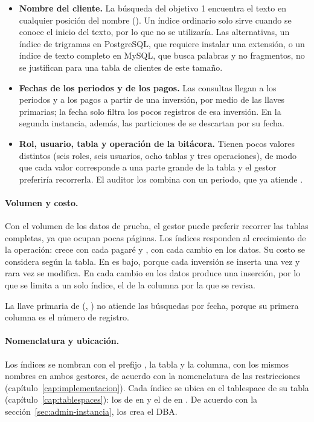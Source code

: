 \begin{itemize}[leftmargin=*]
	\item \textbf{Nombre del cliente.} La búsqueda del objetivo 1 encuentra el texto en cualquier posición del nombre (). Un índice ordinario solo sirve cuando se conoce el inicio del texto, por lo que no se utilizaría. Las alternativas, un índice de trigramas en PostgreSQL, que requiere instalar una extensión, o un índice de texto completo en MySQL, que busca palabras y no fragmentos, no se justifican para una tabla de clientes de este tamaño.
	\item \textbf{Fechas de los periodos y de los pagos.} Las consultas llegan a los periodos y a los pagos a partir de una inversión, por medio de las llaves primarias; la fecha solo filtra los pocos registros de esa inversión. En la segunda instancia, además, las particiones de  se descartan por su fecha.
	\item \textbf{Rol, usuario, tabla y operación de la bitácora.} Tienen pocos valores distintos (seis roles, seis usuarios, ocho tablas y tres operaciones), de modo que cada valor corresponde a una parte grande de la tabla y el gestor preferiría recorrerla. El auditor los combina con un periodo, que ya atiende .
\end{itemize}

\paragraph{Volumen y costo.} Con el volumen de los datos de prueba, el gestor puede preferir recorrer las tablas completas, ya que ocupan pocas páginas. Los índices responden al crecimiento de la operación:  crece con cada pagaré y , con cada cambio en los datos. Su costo se considera según la tabla. En  es bajo, porque cada inversión se inserta una vez y rara vez se modifica. En  cada cambio en los datos produce una inserción, por lo que se limita a un solo índice, el de la columna por la que se revisa.

La llave primaria de  (, ) no atiende las búsquedas por fecha, porque su primera columna es el número de registro.

\paragraph{Nomenclatura y ubicación.} Los índices se nombran con el prefijo , la tabla y la columna, con los mismos nombres en ambos gestores, de acuerdo con la nomenclatura de las restricciones (capítulo~\ref{cap:implementacion}). Cada índice se ubica en el tablespace de su tabla (capítulo~\ref{cap:tablespaces}): los de  en  y el de  en . De acuerdo con la sección~\ref{sec:admin-instancia}, los crea el DBA.

